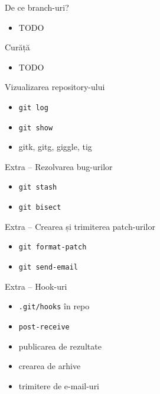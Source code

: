 \documentclass{beamer}
\begin{document}
\begin{frame}{De ce branch-uri?}
  \begin{itemize}
    \item TODO
  \end{itemize}
\end{frame}

\begin{frame}{Curăță}
  \begin{itemize}
    \item TODO
  \end{itemize}
\end{frame}

\begin{frame}{Vizualizarea repository-ului}
  \begin{itemize}
    \item \texttt{git log}
    \item \texttt{git show}
    \item gitk, gitg, giggle, tig
  \end{itemize}
\end{frame}

\begin{frame}{Extra -- Rezolvarea bug-urilor}
  \begin{itemize}
    \item \texttt{git stash}
    \item \texttt{git bisect}
  \end{itemize}
\end{frame}

\begin{frame}{Extra -- Crearea și trimiterea patch-urilor}
  \begin{itemize}
    \item \texttt{git format-patch}
    \item \texttt{git send-email}
  \end{itemize}
\end{frame}

\begin{frame}{Extra -- Hook-uri}
  \begin{itemize}
    \item \texttt{.git/hooks} în repo
    \item \texttt{post-receive}
    \item publicarea de rezultate
    \item crearea de arhive
    \item trimitere de e-mail-uri
  \end{itemize}
\end{frame}
\end{document}
